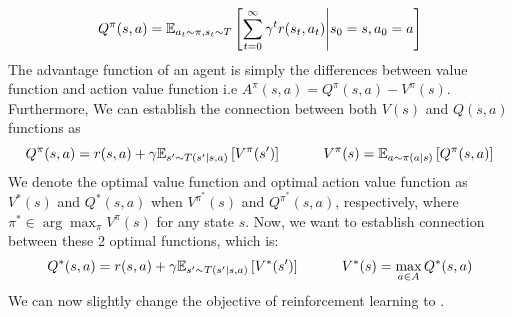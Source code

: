 \begin{equation}
    Q^\pi(s, a) = \mathbb{E}_{a_t \sim \pi, s_t \sim T}\left[ \sum^\infty_{t=0} \gamma^t r(s_t, a_t) \Bigg| s_0 = s, a_0 = a \right]
\end{equation}
The advantage function of an agent is simply the differences between value function and action value function i.e $A^{\pi}(s, a) = Q^\pi(s, a) - V^\pi(s)$. Furthermore, We can establish the connection between both $V(s)$ and $Q(s, a)$ functions as
\begin{equation}
    \label{eqn:chap2-Q-and-V}
    Q^\pi(s, a) = r(s, a) + \gamma \mathbb{E}_{s' \sim T(s' | s, a)}\left[ V^\pi(s') \right] \quad \quad \quad V^\pi(s) = \mathbb{E}_{a \sim \pi(a | s)} \left[ Q^\pi(s, a) \right]
\end{equation}
We denote the optimal value function and optimal action value function as $V^*(s)$ and $Q^*(s, a)$ when $V^{\pi^*}(s)$ and $Q^{\pi^*}(s, a)$, respectively, where $\pi^* \in \arg\max_{\pi} V^{\pi}(s)$ for any state $s$. Now, we want to establish connection between these 2 optimal functions, which is:
\begin{equation}
\label{eqn:chap2-optim-Q-and-V}
    Q^*(s, a) = r(s, a) + \gamma \mathbb{E}_{s' \sim T(s' | s, a)}\left[ V^*(s') \right] \quad \quad \quad V^*(s) =\max_{a\in A} Q^*(s, a)
\end{equation}
We can now slightly change the objective of reinforcement learning to .

